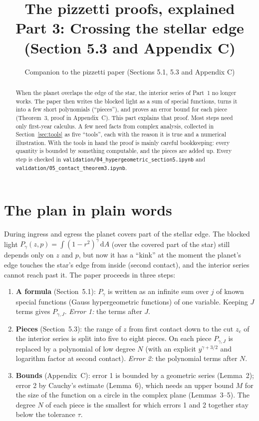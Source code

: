 \documentclass[11pt,a4paper]{article}
\title{The pizzetti proofs, explained\\[4pt]\large Part 3: Crossing the stellar edge (Section 5.3 and Appendix C)}
\author{Companion to the pizzetti paper (Sections 5.1, 5.3 and Appendix C)}
\date{}
\theoremstyle{remark}
\newcommand{\dd}{\mathrm{d}}
\newcommand{\nb}[1]{\texttt{validation/#1}}
\begin{document}
\maketitle

\begin{abstract}
\noindent When the planet overlaps the edge of the star, the interior series of Part~1 no longer
works. The paper then writes the blocked light as a sum of special functions, turns it into a few
short polynomials (``pieces''), and proves an error bound for each piece (Theorem~3, proof in
Appendix~C). This part explains that proof. Most steps need only first-year calculus. A few need
facts from complex analysis, collected in Section~\ref{sec:tools} as five ``tools'', each with the
reason it is true and a numerical illustration. With the tools in hand the proof is mainly careful
bookkeeping: every quantity is bounded by something computable, and the pieces are added up.
Every step is checked in \nb{04\_hypergeometric\_section5.ipynb} and
\nb{05\_contact\_theorem3.ipynb}.
\end{abstract}

\tableofcontents

\section{The plan in plain words}
\label{sec:plan}

During ingress and egress the planet covers part of the stellar edge. The blocked light
$P_\gamma(z,p)=\int(1-r^2)^\gamma\,\dd A$ (over the covered part of the star) still depends only on
$z$ and $p$, but now it has a ``kink'' at the moment the planet's edge touches the star's edge from
inside (second contact), and the interior series cannot reach past it. The paper proceeds in three
steps:
\begin{enumerate}
  \item \textbf{A formula} (Section~5.1): $P_\gamma$ is written as an infinite sum over $j$ of known
        special functions (Gauss hypergeometric functions) of one variable. Keeping $J$ terms gives
        $P_{\gamma,J}$. \emph{Error 1:} the terms after $J$.
  \item \textbf{Pieces} (Section~5.3): the range of $z$ from first contact down to the cut $z_c$ of
        the interior series is split into five to eight pieces. On each piece $P_{\gamma,J}$ is
        replaced by a polynomial of low degree $N$ (with an explicit $y^{\gamma+3/2}$ and
        logarithm factor at second contact). \emph{Error 2:} the polynomial terms after $N$.
  \item \textbf{Bounds} (Appendix~C): error 1 is bounded by a geometric series (Lemma~2); error 2
        by Cauchy's estimate (Lemma~6), which needs an upper bound $M$ for the size of the function
        on a circle in the complex plane (Lemmas~3--5). The degree $N$ of each piece is the smallest
        for which errors 1 and 2 together stay below the tolerance $\tau$.
\end{enumerate}
\end{document}
